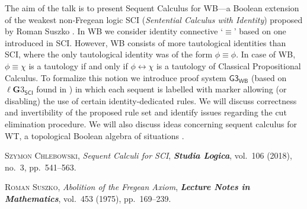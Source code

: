 \documentclass[bsl,meeting]{asl}
\newcommand{\NP}{}
\begin{document}
\thispagestyle{empty}


\NP  
{}

The aim of the talk is to present Sequent Calculus for \textsf{WB}---a Boolean extension of the weakest non-Fregean logic \textsf{SCI} (\textit{Sentential Calculus with Identity}) proposed by Roman Suszko \cite{suszko1975}. In \textsf{WB} we consider identity connective `$\equiv$' based on one introduced in \textsf{SCI}. However, \textsf{WB} consists of more tautological identities than \textsf{SCI}, where the only tautological identity was of the form $\phi \equiv \phi$.  In case of \textsf{WB}, $\phi \equiv \chi$ is a tautology if and only if  $\phi \leftrightarrow \chi$ is a tautology of Classical Propositional Calculus. To formalize this notion we introduce proof system $\mathsf{G3}_{\mathsf{WB}}$ (based on ${\ell\mathbf{G}3}_\mathsf{SCI}$ found in \cite{chlebowski2018}) in which each sequent is labelled with marker allowing (or disabling) the use of certain identity-dedicated rules. We will discuss correctness  and invertibility of the proposed rule set and identify issues regarding the cut elimination procedure. We will also discuss ideas concerning sequent calculus for \textsf{WT}, a topological Boolean algebra of situations \cite{suszko1975}.

\begin{thebibliography}{10}

{\scshape Szymon Chlebowski},
{\itshape Sequent Calculi for SCI},
{\bfseries\itshape Studia Logica},
vol.~106 (2018), no.~3, pp.~541--563.

{\scshape Roman Suszko},
{\itshape Abolition of the Fregean Axiom},
{\bfseries\itshape Lecture Notes in Mathematics},
vol.~453 (1975), pp.~169--239.

\end{thebibliography}


\vspace*{-0.5\baselineskip}
\end{document}
